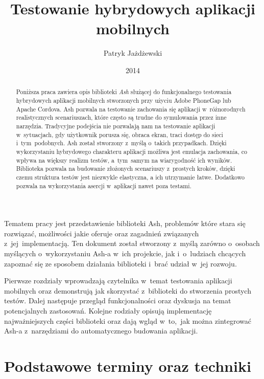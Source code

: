 \documentclass[brudnopis]{xmgr}
\author   {Patryk Jażdżewski}
\title    {Testowanie hybrydowych aplikacji mobilnych}
\date     {2014}
\begin{document}
\begin{abstract}

  Poniższa praca zawiera opis biblioteki \textit{Ash} służącej do funkcjonalnego testowania
hybrydowych aplikacji mobilnych stworzonych przy użyciu Adobe PhoneGap lub
Apache Cordova. Ash pozwala na testowanie zachowania się aplikacji w~różnorodnych
realistycznych scenariuszach, które często są trudne do symulowania przez inne narzędzia. Tradycyjne podejścia nie pozwalają nam na testowanie aplikacji w~sytuacjach, gdy  użytkownik porusza się,
obraca ekran, traci dostęp do sieci i~tym~podobnych. Ash został stworzony z~myślą o~takich przypadkach. Dzięki wykorzystaniu hybrydowego charakteru aplikacji
możliwa jest emulacja zachowania, co wpływa na większy realizm testów, a~tym~samym na wiarygodność ich wyników. 
Biblioteka pozwala na budowanie złożonych scenariuszy z~prostych kroków, dzięki czemu struktura testów jest niezwykle elastyczna, a ich utrzymanie łatwe. 
Dodatkowo pozwala na wykorzystania asercji w~aplikacji nawet poza testami. 

\end{abstract}

\maketitle

\introduction

Tematem pracy jest przedstawienie biblioteki Ash, problemów które stara się rozwiązać, możliwości jakie oferuje oraz zagadnień związanych z~jej~implementacją. Ten dokument  został stworzony z~myślą zarówno o~osobach myślących o~wykorzystaniu Ash-a w~ich projekcie, jak i~o~ludziach chcących zapoznać się ze sposobem działania biblioteki i~brać udział w~jej rozwoju.  

Pierwsze rozdziały wprowadzają czytelnika w~temat testowania aplikacji mobilnych oraz demonstrują jak skorzystać z~biblioteki do stworzenia prostych testów. Dalej następuje przegląd funkcjonalności oraz dyskusja na temat potencjalnych zastosowań. Kolejne rodziały opisują implementację najważniejszych części biblioteki oraz dają wgląd w~to,~jak można zintegrować Ash-a z~narzędziami do automatycznego budowania aplikacji.

\chapter{Podstawowe terminy oraz techniki}
\end{document}
